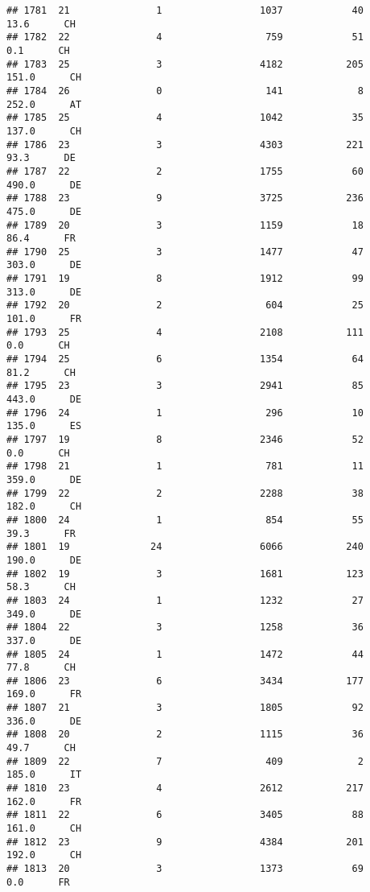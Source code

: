 \documentclass[
]{article}
\begin{document}
\begin{verbatim}
## 1781  21               1                 1037            40     13.6      CH
## 1782  22               4                  759            51      0.1      CH
## 1783  25               3                 4182           205    151.0      CH
## 1784  26               0                  141             8    252.0      AT
## 1785  25               4                 1042            35    137.0      CH
## 1786  23               3                 4303           221     93.3      DE
## 1787  22               2                 1755            60    490.0      DE
## 1788  23               9                 3725           236    475.0      DE
## 1789  20               3                 1159            18     86.4      FR
## 1790  25               3                 1477            47    303.0      DE
## 1791  19               8                 1912            99    313.0      DE
## 1792  20               2                  604            25    101.0      FR
## 1793  25               4                 2108           111      0.0      CH
## 1794  25               6                 1354            64     81.2      CH
## 1795  23               3                 2941            85    443.0      DE
## 1796  24               1                  296            10    135.0      ES
## 1797  19               8                 2346            52      0.0      CH
## 1798  21               1                  781            11    359.0      DE
## 1799  22               2                 2288            38    182.0      CH
## 1800  24               1                  854            55     39.3      FR
## 1801  19              24                 6066           240    190.0      DE
## 1802  19               3                 1681           123     58.3      CH
## 1803  24               1                 1232            27    349.0      DE
## 1804  22               3                 1258            36    337.0      DE
## 1805  24               1                 1472            44     77.8      CH
## 1806  23               6                 3434           177    169.0      FR
## 1807  21               3                 1805            92    336.0      DE
## 1808  20               2                 1115            36     49.7      CH
## 1809  22               7                  409             2    185.0      IT
## 1810  23               4                 2612           217    162.0      FR
## 1811  22               6                 3405            88    161.0      CH
## 1812  23               9                 4384           201    192.0      CH
## 1813  20               3                 1373            69      0.0      FR

\end{verbatim}
\end{document}
